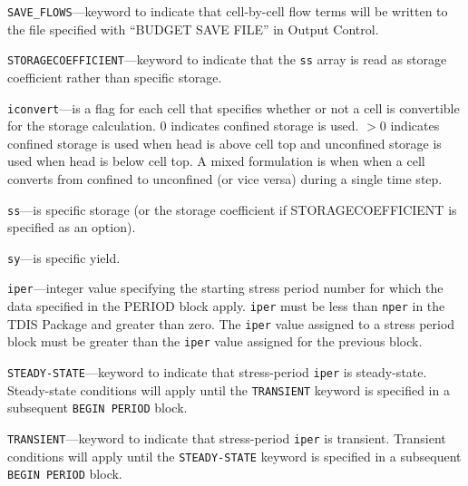 
\item \texttt{SAVE\_FLOWS}---keyword to indicate that cell-by-cell flow terms will be written to the file specified with ``BUDGET SAVE FILE'' in Output Control.

\item \texttt{STORAGECOEFFICIENT}---keyword to indicate that the \texttt{ss} array is read as storage coefficient rather than specific storage.

\item \texttt{iconvert}---is a flag for each cell that specifies whether or not a cell is convertible for the storage calculation.  0 indicates confined storage is used. $>$0 indicates confined storage is used when head is above cell top and unconfined storage is used when head is below cell top.  A mixed formulation is when when a cell converts from confined to unconfined (or vice versa) during a single time step.

\item \texttt{ss}---is specific storage (or the storage coefficient if STORAGECOEFFICIENT is specified as an option).

\item \texttt{sy}---is specific yield.

\item \texttt{iper}---integer value specifying the starting stress period number for which the data specified in the PERIOD block apply.  \texttt{iper} must be less than \texttt{nper} in the TDIS Package and greater than zero.  The \texttt{iper} value assigned to a stress period block must be greater than the \texttt{iper} value assigned for the previous block.

\item \texttt{STEADY-STATE}---keyword to indicate that stress-period \texttt{iper} is steady-state. Steady-state conditions will apply until the \texttt{TRANSIENT} keyword is specified in a subsequent \texttt{BEGIN PERIOD} block.

\item \texttt{TRANSIENT}---keyword to indicate that stress-period \texttt{iper} is transient. Transient conditions will apply until the \texttt{STEADY-STATE} keyword is specified in a subsequent \texttt{BEGIN PERIOD} block.


